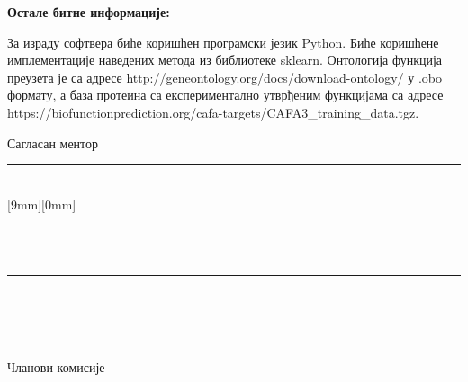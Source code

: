 \documentclass[a4paper]{article}
\begin{document}
\begin{flushleft}
{\begin{minipage}[t][12cm]{17cm}
\textbf{Остале битне информације:}

За израду софтвера биће коришћен програмски језик Python. Биће коришћене имплементације наведених метода из библиотеке sklearn. Онтологија функција преузета је са адресе http://geneontology.org/docs/download-ontology/ у .obo формату, а база протеина са експериментално утврђеним функцијама са адресе  https://biofunctionprediction.org/cafa-targets/CAFA3\_training\_data.tgz.
\\


\end{minipage}
}
\end{flushleft}
\vspace{1cm}
Сагласан ментор  \\
\rule[4mm]{10cm}{.05mm} \hfill {} \\
\raisebox{1cm}%
[9mm][0mm]{} \\
\makebox[10cm]{ }\\
\vspace{-1cm}\\
\rule[2cm]{6.5cm}{.05mm} \hfill \rule[2cm]{6.5cm}{.05mm}\\
\vspace{-2.4cm}\\
\hfill {}\\
\vspace{-2cm}\\
\makebox[5.5cm]{}  Чланови комисије\\
\end{document}
